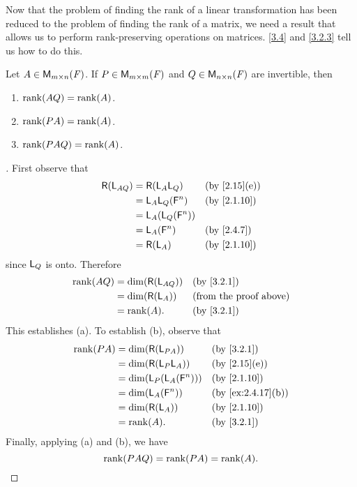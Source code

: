 \begin{note}
  Now that the problem of finding the rank of a linear transformation has been reduced to the problem of finding the rank of a matrix, we need a result that allows us to perform rank-preserving operations on matrices.
  \cref{3.4} and \cref{3.2.3} tell us how to do this.
\end{note}

\begin{thm}\label{3.4}
  Let \(A \in \ms\).
  If \(P \in \ms[m][m][\F]\) and \(Q \in \ms[n][n][\F]\) are invertible, then
  \begin{enumerate}
    \item \(\rk{AQ} = \rk{A}\).
    \item \(\rk{PA} = \rk{A}\).
    \item \(\rk{PAQ} = \rk{A}\).
  \end{enumerate}
\end{thm}

\begin{proof}[]
  First observe that
  \begin{align*}
    \rg{\L_{AQ}} & = \rg{\L_A \L_Q}       &  & \by{2.15}[e] \\
                 & = \L_A \L_Q(\vs{F}^n)  &  & \by{2.1.10}  \\
                 & = \L_A(\L_Q(\vs{F}^n))                   \\
                 & = \L_A(\vs{F}^n)       &  & \by{2.4.7}   \\
                 & = \rg{\L_A}            &  & \by{2.1.10}
  \end{align*}
  since \(\mathsf{L}_Q\) is onto.
  Therefore
  \begin{align*}
    \rk{AQ} & = \dim(\rg{\L_{AQ}}) &  & \by{3.2.1}                    \\
            & = \dim(\rg{\L_A})    &  & \text{(from the proof above)} \\
            & = \rk{A}.            &  & \by{3.2.1}
  \end{align*}
  This establishes (a).
  To establish (b), observe that
  \begin{align*}
    \rk{PA} & = \dim(\rg{\L_{PA}})         &  & \by{3.2.1}        \\
            & = \dim(\rg{\L_P \L_A})       &  & \by{2.15}[e]      \\
            & = \dim(\L_P(\L_A(\vs{F}^n))) &  & \by{2.1.10}       \\
            & = \dim(\L_A(\vs{F}^n))       &  & \by{ex:2.4.17}[b] \\
            & = \dim(\rg{\L_A})            &  & \by{2.1.10}       \\
            & = \rk{A}.                    &  & \by{3.2.1}
  \end{align*}
  Finally, applying (a) and (b), we have
  \[
    \rk{PAQ} = \rk{PA} = \rk{A}.
  \]
\end{proof}

